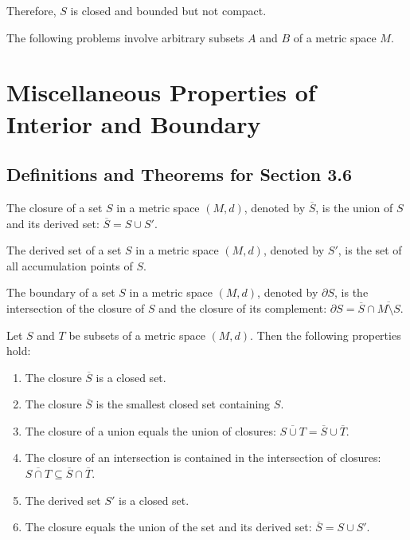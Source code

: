 Therefore, $S$ is closed and bounded but not compact.

\begin{problembox}
The following problems involve arbitrary subsets \( A \) and \( B \) of a metric space \( M \).
\end{problembox}

\section{Miscellaneous Properties of Interior and Boundary}

\subsection*{Definitions and Theorems for Section 3.6}

\begin{definition}
The closure of a set $S$ in a metric space $(M,d)$, denoted by $\overline{S}$, is the union of $S$ and its derived set: $\overline{S} = S \cup S'$.
\end{definition}

\begin{definition}
The derived set of a set $S$ in a metric space $(M,d)$, denoted by $S'$, is the set of all accumulation points of $S$.
\end{definition}

\begin{definition}
The boundary of a set $S$ in a metric space $(M,d)$, denoted by $\partial S$, is the intersection of the closure of $S$ and the closure of its complement: $\partial S = \overline{S} \cap \overline{M \setminus S}$.
\end{definition}

\begin{theorem}
Let $S$ and $T$ be subsets of a metric space $(M,d)$. Then the following properties hold:
\begin{enumerate}
\item The closure $\overline{S}$ is a closed set.
\item The closure $\overline{S}$ is the smallest closed set containing $S$.
\item The closure of a union equals the union of closures: $\overline{S \cup T} = \overline{S} \cup \overline{T}$.
\item The closure of an intersection is contained in the intersection of closures: $\overline{S \cap T} \subseteq \overline{S} \cap \overline{T}$.
\item The derived set $S'$ is a closed set.
\item The closure equals the union of the set and its derived set: $\overline{S} = S \cup S'$.
\end{enumerate}
\end{theorem}

